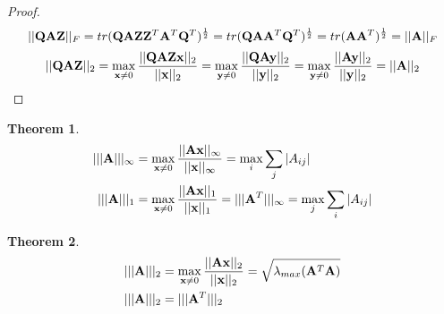 \documentclass[11pt]{article}
\def\A{{\bf A}}
\def\Q{{\bf Q}}
\def\x{{\bf x}}
\def\y{{\bf y}}
\def\Z{{\bf Z}}
\newtheorem{theorem}{Theorem}[section]
\begin{document}
\begin{proof}
	$$||\Q\A\Z||_F=tr(\Q\A\Z\Z^T\A^T\Q^T)^\frac{1}{2}=tr(\Q\A\A^T\Q^T)^\frac{1}{2}=tr(\A\A^T)^\frac{1}{2}=||\A||_F$$
	$$||\Q\A\Z||_2=\max_{\x\ne0}\frac{||\Q\A\Z\x||_2}{||\x||_2}=\max_{\y\ne0}\frac{||\Q\A\y||_2}{||\y||_2}=\max_{\y\ne0}\frac{||\A\y||_2}{||\y||_2}=||\A||_2$$
\end{proof}

\begin{theorem}
	\[
	\begin{aligned}
	|||\A|||_\infty& =\max_{\x\ne0} \frac{||\A\x||_\infty}{||\x||_\infty}=\max_{i}\sum_j|A_{ij}| \\
	|||\A|||_1&=\max_{\x\ne0} \frac{||\A\x||_1}{||\x||_1}=|||\A^T|||_\infty=\max_{j}\sum_i|A_{ij}|
	\end{aligned}
	\]
\end{theorem}

\begin{theorem}
	\[
	\begin{aligned}
	|||\A|||_2 &=\max_{\x\ne0} \frac{||\A\x||_2}{||\x||_2}=\sqrt{\lambda_{max}(\A^T\A)} \\
	|||\A|||_2 &=|||\A^T|||_2
	\end{aligned}
	\]
\end{theorem}
\end{document}
